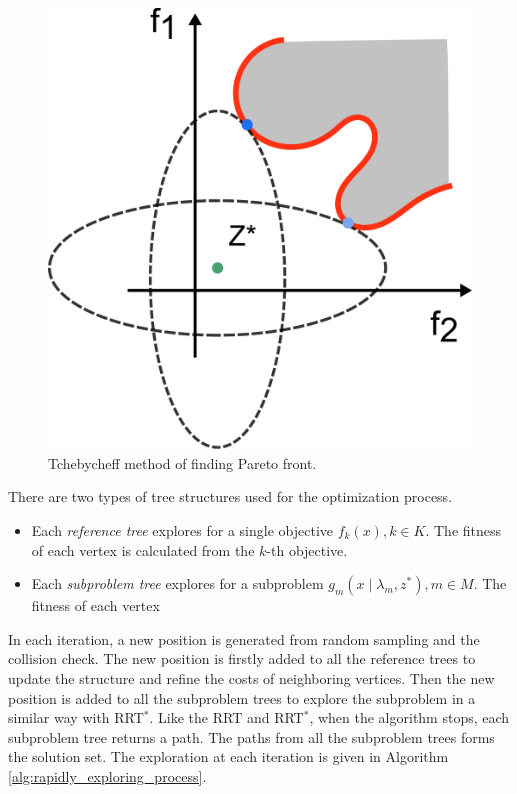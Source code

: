 \documentclass[conference]{IEEEtran}
\begin{document}
\begin{figure}
\centering
\includegraphics[width=0.9\linewidth]{fig/Tchebycheff}
\caption{Tchebycheff method of finding Pareto front.}
\label{fig:Tchebycheff}
\end{figure}

There are two types of tree structures used for the optimization process.
\begin{itemize}
\item Each \emph{reference tree} explores for a single objective $ f_{k} (x), k \in K $. 
The fitness of each vertex is calculated from the $ k $-th objective.
\item Each \emph{subproblem tree} explores for a subproblem $ g_{m} ( x \mid \lambda_{m} , z^{*} ) , m \in M $.
The fitness of each vertex 
\end{itemize}
In each iteration, a new position is generated from random sampling and the collision check.
The new position is firstly added to all the reference trees to update the structure and refine the costs of neighboring vertices.
Then the new position is added to all the subproblem trees to explore the subproblem in a similar way with RRT$^{*}$.
Like the RRT and RRT$^{*}$, when the algorithm stops, each subproblem tree returns a path.
The paths from all the subproblem trees forms the solution set.
The exploration at each iteration is given in Algorithm \ref{alg:rapidly_exploring_process}.
\end{document}
